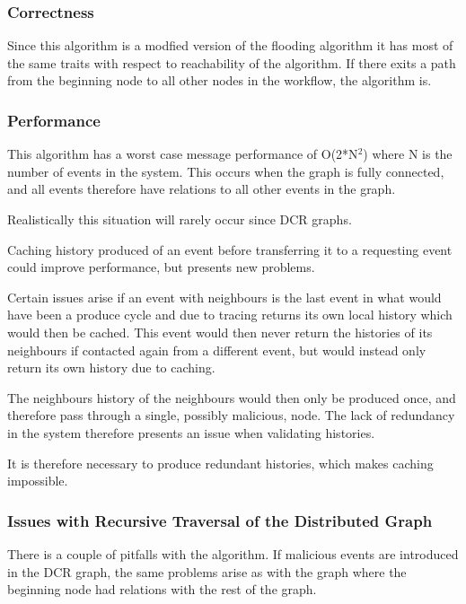 	\subsubsection{Correctness}
	Since this algorithm is a modfied version of the flooding algorithm it has most of the same traits with respect to reachability of the algorithm. If there exits a path from the beginning node to all other nodes in the workflow, the algorithm is. 
	
	\subsubsection{Performance}
	This algorithm has a worst case message performance of O(2*N$^2$) where N is the number of events in the system. This occurs when the graph is fully connected, and all events therefore have relations to all other events in the graph. 
	
	Realistically this situation will rarely occur since DCR graphs. 
	
	\newpar Caching history produced of an event before transferring it to a requesting event could improve performance, but presents new problems. 
	
	Certain issues arise if an event with neighbours is the last event in what would have been a produce cycle and due to tracing returns its own local history which would then be cached. This event would then never return the histories of its neighbours if contacted again from a different event, but would instead only return its own history due to caching. 
	
	The neighbours history of the neighbours would then only be produced once, and therefore pass through a single, possibly malicious, node. The lack of redundancy in the system therefore presents an issue when validating histories.
	
	It is therefore necessary to produce redundant histories, which makes caching impossible.
	
	\subsubsection{Issues with Recursive Traversal of the Distributed Graph}
	
	There is a couple of pitfalls with the algorithm. If malicious events are introduced in the DCR graph, the same problems arise as with the graph where the beginning node had relations with the rest of the graph. 
	
